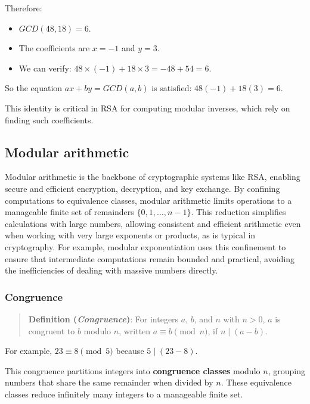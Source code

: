 \documentclass[
  letterpaper,
  DIV=11,
  numbers=noendperiod,
  oneside]{scrartcl}
\providecommand{\tightlist}{%
  \setlength{\itemsep}{0pt}\setlength{\parskip}{0pt}}\usepackage{longtable,booktabs,array}
\begin{document}
Therefore:

\begin{itemize}
\tightlist
\item
  \(GCD(48,18) = 6\).
\item
  The coefficients are \(x = -1\) and \(y = 3\).
\item
  We can verify: \(48 \times (-1) + 18 \times 3 = -48 + 54 = 6\).
\end{itemize}

So the equation \(ax + by = GCD(a,b)\) is satisfied:
\(48(-1) + 18(3) = 6\).

This identity is critical in RSA for computing modular inverses, which
rely on finding such coefficients.

\subsection{Modular arithmetic}\label{modular-arithmetic}

Modular arithmetic is the backbone of cryptographic systems like RSA,
enabling secure and efficient encryption, decryption, and key exchange.
By confining computations to equivalence classes, modular arithmetic
limits operations to a manageable finite set of remainders
\(\{0, 1, \dots, n-1\}\). This reduction simplifies calculations with
large numbers, allowing consistent and efficient arithmetic even when
working with very large exponents or products, as is typical in
cryptography. For example, modular exponentiation uses this confinement
to ensure that intermediate computations remain bounded and practical,
avoiding the inefficiencies of dealing with massive numbers directly.

\subsubsection{Congruence}\label{congruence}

\begin{quote}
\textbf{Definition (\emph{Congruence})}: For integers \(a\), \(b\), and
\(n\) with \(n > 0\), \(a\) is congruent to \(b\) modulo \(n\), written
\(a \equiv b \pmod{n}\), if \(n \mid (a - b)\).
\end{quote}

For example, \(23 \equiv 8 \pmod{5}\) because \(5 \mid (23 - 8)\).

This congruence partitions integers into \textbf{congruence classes}
modulo \(n\), grouping numbers that share the same remainder when
divided by \(n\). These equivalence classes reduce infinitely many
integers to a manageable finite set.
\end{document}
